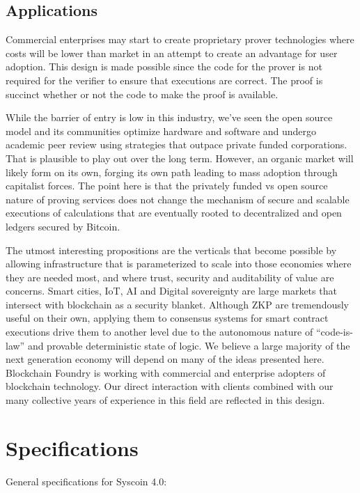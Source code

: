 \documentclass[peerreview]{ieeesyscoin}
\begin{document}
\subsection{Applications}

Commercial enterprises may start to create proprietary prover technologies where costs will be lower than market in an attempt to create an advantage for user adoption. This design is made possible since the code for the prover is not required for the verifier to ensure that executions are correct. The proof is succinct whether or not the code to make the proof is available.

While  the barrier of entry is low in this industry, we’ve seen the open source model and its communities optimize hardware and software and undergo academic peer review using strategies  that outpace private funded corporations. That is plausible to play out over the long term. However, an organic market will likely form on its own, forging its own path leading to mass adoption through capitalist forces. The point here is that the privately funded vs open source nature of proving services does not change the mechanism of secure and scalable executions of calculations that are eventually rooted to decentralized and open ledgers secured by Bitcoin.

The utmost interesting propositions are the verticals that become possible by allowing infrastructure that is parameterized to scale into those economies where they are needed most, and where trust, security and auditability of value are concerns. Smart cities, IoT, AI and Digital sovereignty are large markets that intersect with blockchain as a security blanket. Although ZKP are tremendously useful on their own, applying them to consensus systems for smart contract executions drive them to another level due to the autonomous nature of “code-is-law” and provable deterministic state of logic. We believe a large majority of the next generation economy will depend on many of the ideas presented here. Blockchain Foundry is working with commercial and enterprise adopters of blockchain technology. Our direct interaction with clients combined with our many collective years of experience in this field are reflected in this design.


\section{Specifications}
\label{section:specs}

General specifications for Syscoin 4.0:
\end{document}
